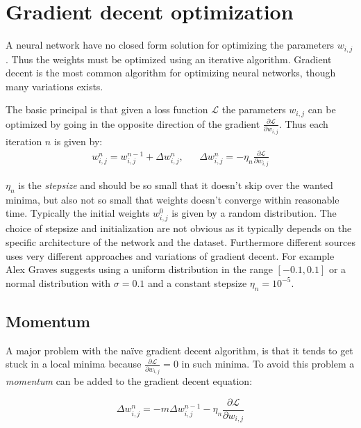 \section{Gradient decent optimization}

A neural network have no closed form solution for optimizing the parameters $w_{i,j}$. Thus the weights must be optimized using an iterative algorithm. Gradient decent is the most common algorithm for optimizing neural networks, though many variations exists.

The basic principal is that given a loss function $\mathcal{L}$ the parameters $w_{i,j}$ can be optimized by going in the opposite direction of the gradient $\frac{\partial \mathcal{L}}{\partial w_{i,j}}$. Thus each iteration $n$ is given by:
\begin{equation}
\begin{aligned}
w_{i,j}^n = w_{i,j}^{n-1} + \Delta w_{i,j}^n, && \Delta w_{i,j}^n = - \eta_n \frac{\partial \mathcal{L}}{\partial w_{i,j}}
\end{aligned}
\end{equation}

$\eta_n$ is the \textit{stepsize} and should be so small that it doesn't skip over the wanted minima, but also not so small that weights doesn't converge within reasonable time. Typically the initial weights $w^0_{i,j}$ is given by a random distribution. The choice of stepsize and initialization are not obvious as it typically depends on the specific architecture of the network and the dataset. Furthermore different sources uses very different approaches and variations of gradient decent. For example Alex Graves \cite{alexgraves} suggests using a uniform distribution in the range $[-0.1, 0.1]$ or a normal distribution with $\sigma = 0.1$ and a constant stepsize $\eta_n = 10^{-5}$.

\subsection{Momentum}

A major problem with the naïve gradient decent algorithm, is that it tends to get stuck in a local minima because $\frac{\partial \mathcal{L}}{\partial w_{i,j}} = 0$ in such minima. To avoid this problem a \textit{momentum} can be added to the gradient decent equation:

\begin{equation}
\Delta w_{i,j}^n = - m \Delta w_{i,j}^{n-1} - \eta_n \frac{\partial \mathcal{L}}{\partial w_{i,j}}
\end{equation}

